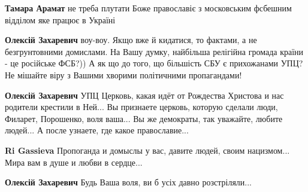 \begin{itemize}
\begin{itemize}
\begin{itemize}
 
\textbf{Тамара Арамат} не треба плутати Боже православіє з московським фсбешним відділом яке працює в Україні

 
\textbf{Олексій Захаревич} воу-воу. Якщо вже й кидатися, то фактами, а не
безгрунтовними домислами. На Вашу думку, найбільша релігійна громада країни -
це російське ФСБ?)) А як що до того, що більшість СБУ є прихожанами УПЦ? Не
мішайте віру з Вашими хворими політичними пропагандами!

 
\textbf{Олексій Захаревич} УПЦ Церковь, какая идёт от Рождества Христова и нас
родители крестили в Ней... Вы признаете церковь, которую сделали люди, Филарет,
Порошенко, воля ваша... Вы же демократы, так уважайте, любите людей... А после
узнаете, где какое православие...

 
\textbf{Ri Gassieva} Пропоганда и домыслы у вас, давите людей, своим нацизмом... Мира вам в душе и любви в сердце...
\end{itemize}

 
\textbf{Олексій Захаревич} Будь Ваша воля, ви б усіх давно розстріляли...


\end{itemize}
\end{itemize}
